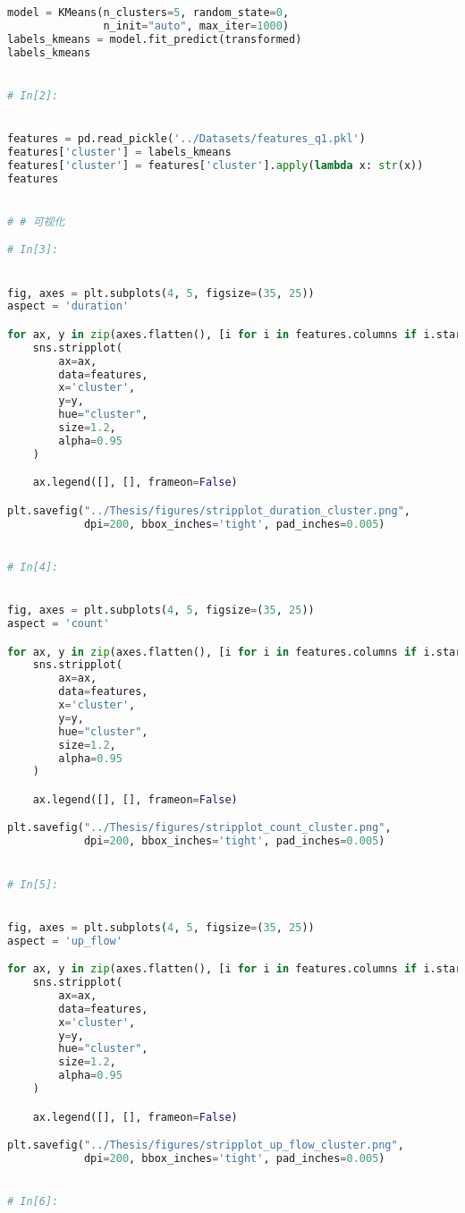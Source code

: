 \documentclass[withoutpreface,bwprint]{cumcmthesis}
\begin{document}
\begin{appendices}
\begin{lstlisting}[language=Python]
model = KMeans(n_clusters=5, random_state=0,
               n_init="auto", max_iter=1000)
labels_kmeans = model.fit_predict(transformed)
labels_kmeans


# In[2]:


features = pd.read_pickle('../Datasets/features_q1.pkl')
features['cluster'] = labels_kmeans
features['cluster'] = features['cluster'].apply(lambda x: str(x))
features


# # 可视化

# In[3]:


fig, axes = plt.subplots(4, 5, figsize=(35, 25))
aspect = 'duration'

for ax, y in zip(axes.flatten(), [i for i in features.columns if i.startswith(aspect)]):
    sns.stripplot(
        ax=ax,
        data=features,
        x='cluster',
        y=y,
        hue="cluster",
        size=1.2,
        alpha=0.95
    )

    ax.legend([], [], frameon=False)

plt.savefig("../Thesis/figures/stripplot_duration_cluster.png",
            dpi=200, bbox_inches='tight', pad_inches=0.005)


# In[4]:


fig, axes = plt.subplots(4, 5, figsize=(35, 25))
aspect = 'count'

for ax, y in zip(axes.flatten(), [i for i in features.columns if i.startswith(aspect)]):
    sns.stripplot(
        ax=ax,
        data=features,
        x='cluster',
        y=y,
        hue="cluster",
        size=1.2,
        alpha=0.95
    )

    ax.legend([], [], frameon=False)

plt.savefig("../Thesis/figures/stripplot_count_cluster.png",
            dpi=200, bbox_inches='tight', pad_inches=0.005)


# In[5]:


fig, axes = plt.subplots(4, 5, figsize=(35, 25))
aspect = 'up_flow'

for ax, y in zip(axes.flatten(), [i for i in features.columns if i.startswith(aspect)]):
    sns.stripplot(
        ax=ax,
        data=features,
        x='cluster',
        y=y,
        hue="cluster",
        size=1.2,
        alpha=0.95
    )

    ax.legend([], [], frameon=False)

plt.savefig("../Thesis/figures/stripplot_up_flow_cluster.png",
            dpi=200, bbox_inches='tight', pad_inches=0.005)


# In[6]:



\end{lstlisting}
\end{appendices}
\end{document}

